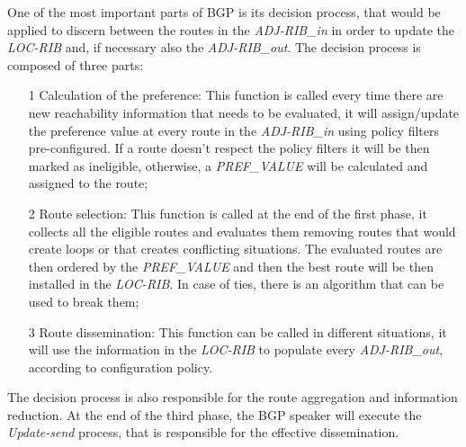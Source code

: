 One of the most important parts of \ac{BGP} is its decision process, that would
be applied to discern between the routes in the \textit{ADJ-RIB\_in} in order
to update the \textit{LOC-RIB} and, if necessary also the \textit{ADJ-RIB\_out}.
The decision process is composed of three parts:
\begin{itemize}
	\item[1] Calculation of the preference: This function is called every time
		there are new reachability information that needs to be evaluated, it
		will assign/update the preference value at every route in the
		\textit{ADJ-RIB\_in} using policy filters pre-configured. If a route
		doesn't respect the policy filters it will be then marked as ineligible,
		otherwise, a \textit{PREF\_VALUE} will be calculated and assigned to the
		route;
	\item[2] Route selection: This function is called at the end of the first
		phase, it collects all the eligible routes and evaluates them removing
		routes that would create loops or that creates conflicting situations.
		The evaluated routes are then ordered by the \textit{PREF\_VALUE} and
		then the best route will be then installed in the \textit{LOC-RIB}.
		In case of ties, there is an algorithm that can be used to break them;
	\item[3] Route dissemination: This function can be called in different
		situations, it will use the information in the \textit{LOC-RIB} to
		populate every \textit{ADJ-RIB\_out}, according to configuration
		policy.
\end{itemize}
The decision process is also responsible for the route aggregation and information
reduction.
At the end of the third phase, the \ac{BGP} speaker will execute the
\textit{Update-send} process, that is responsible for the effective dissemination.

